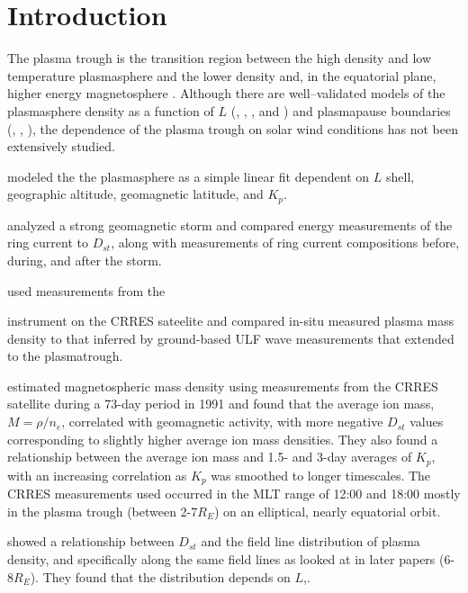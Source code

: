 \documentclass[10pt,twocolumn]{article}
\def\vnote#1\par{\textcolor{red}{\textbf{#1}}\\} %
\begin{document}
\saythanks

\section{Introduction}

The plasma trough is the transition region between the high density and low temperature plasmasphere and the lower density and, in the equatorial plane, higher energy magnetosphere \citep{Mayr1987}.  Although there are well--validated models of the plasmasphere density as a function of $L$ (\cite{Gallagher1988EmpiricalModelPlasmasphere}, \cite{Lemaire}, \cite{Takahashi2006}, and \cite{Takahashi2010}) and plasmapause boundaries (\cite{Lemaire}, \cite{Moldwin}, \cite{OBrien}), the dependence of the plasma trough on solar wind conditions has not been extensively studied.

\cite{Gallagher1988EmpiricalModelPlasmasphere} modeled the the plasmasphere as a simple linear fit dependent on $L$ shell, geographic altitude, geomagnetic latitude, and $K_p$.  \vnote{What was major finding?} \cite{Hamilton1988RingCurrentDevelopment} analyzed a strong geomagnetic storm and compared energy measurements of the ring current to $D_{st}$, along with measurements of ring current compositions before, during, and after the storm.  \vnote{What did they find/conclude?}

\cite{Lotoaniu1999PlasmaMassDensity} used measurements from the \vnote{???} instrument on the CRRES sateelite and compared in-situ measured plasma mass density to that inferred by ground-based ULF wave measurements that extended to the plasmatrough.  \vnote{What did they find/conclude?}

\cite{Takahashi2006} estimated magnetospheric mass density using measurements from the CRRES satellite during a 73-day period in 1991 and found that the average ion mass, $M=\rho/n_e$, correlated with geomagnetic activity, with more negative $D_{st}$ values corresponding to slightly higher average ion mass densities.  They also found a relationship between the average ion mass and 1.5- and 3-day averages of $K_p$, with an increasing correlation as $K_p$ was smoothed to longer timescales.  The CRRES measurements used occurred in the MLT range of 12:00 and 18:00 mostly in the plasma trough (between 2-7$R_E$) on an elliptical, nearly equatorial orbit.

\cite{Denton2006} showed a relationship between $D_{st}$ and the field line distribution of plasma density, and specifically along the same field lines as looked at in later papers (6-8$R_E$). They found that the distribution depends on $L$,.
\end{document}
